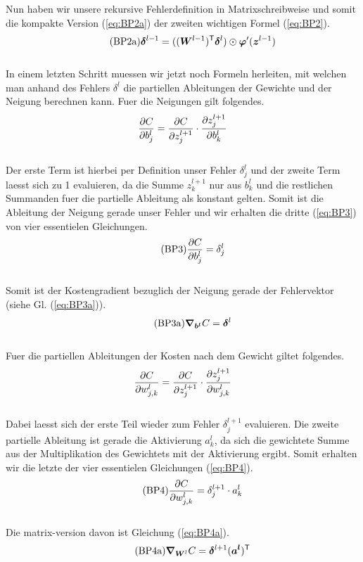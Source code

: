 Nun haben wir unsere rekursive Fehlerdefinition in Matrixschreibweise und somit
die kompakte Version (\ref{eq:BP2a}) der zweiten wichtigen Formel (\ref{eq:BP2}).
\\
\begin{equation}\tag{BP2a}\label{eq:BP2a}
  \bm{\delta}^{l-1} = ((\bm{W}^{l-1})^{\mathsf{T}} \bm{\delta}^l) \odot \bm{\varphi}'(\bm{z}^{l-1})
\end{equation}
\\
In einem letzten Schritt muessen wir jetzt noch Formeln herleiten, mit welchen
man anhand des Fehlers $\delta^l$ die partiellen Ableitungen der Gewichte und
der Neigung berechnen kann.
\para{}
Fuer die Neigungen gilt folgendes.
\\
\begin{equation*}
  \frac{\partial C}{\partial b_j^l} = \frac{\partial C}{\partial z_j^{l+1}} \cdot \frac{\partial z_j^{l+1}}{\partial b_k^l}
\end{equation*}
\\
Der erste Term ist hierbei per Definition unser Fehler $\delta_j^l$ und der
zweite Term laesst sich zu 1 evaluieren, da die Summe $z_k^{l+1}$ nur aus
$b_k^l$ und die restlichen Summanden fuer die partielle Ableitung als konstant gelten.
Somit ist die Ableitung der Neigung gerade unser Fehler und wir erhalten die
dritte (\ref{eq:BP3}) von vier essentielen Gleichungen.
\\
\begin{equation}\tag{BP3}\label{eq:BP3}
  \frac{\partial C}{\partial b_j^l} = \delta_j^l
\end{equation}
\\
Somit ist der Kostengradient bezuglich der Neigung gerade der Fehlervektor
(siehe Gl. (\ref{eq:BP3a})).
\\
\begin{equation}\tag{BP3a}\label{eq:BP3a}
  \bm{\nabla}_{\bm{b^l}} C =  \bm{\delta}^l
\end{equation}
\\
Fuer die partiellen Ableitungen der Kosten nach dem Gewicht giltet folgendes.
\\
\begin{equation}
  \frac{\partial C}{\partial w_{j,k}^l} = \frac{\partial C}{\partial z_j^{l+1}} \cdot \frac{\partial z_j^{l+1}}{\partial w_{j,k}^l}
\end{equation}
\\
Dabei laesst sich der erste Teil wieder zum Fehler $\delta_j^{l+1}$ evaluieren.
Die zweite partielle Ableitung ist gerade die Aktivierung $a_k^l$, da sich die
gewichtete Summe aus der Multiplikation des Gewichtets mit der Aktivierung ergibt.
Somit erhalten wir die letzte der vier essentielen Gleichungen (\ref{eq:BP4}).
\begin{equation}\tag{BP4}\label{eq:BP4}
  \frac{\partial C}{\partial w_{j,k}^l} = \delta_j^{l+1} \cdot a_k^l
\end{equation}
\\
Die matrix-version davon ist Gleichung (\ref{eq:BP4a}).
\begin{equation}\tag{BP4a}\label{eq:BP4a}
  \bm{\nabla}_{\bm{W}^l} C = \bm{\delta}^{l+1} (\bm{a^l})^{\mathsf{T}}
\end{equation}


